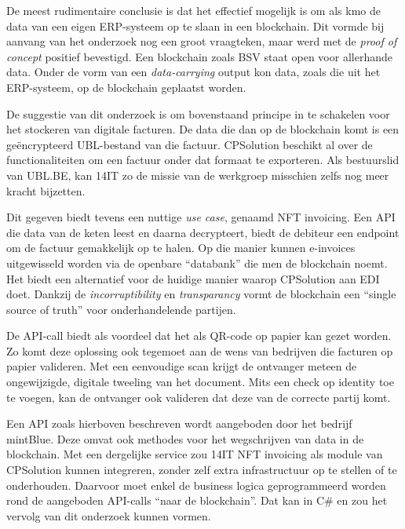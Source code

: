 De meest rudimentaire conclusie is dat het effectief mogelijk is om als kmo de data van een eigen ERP-systeem op te slaan in een blockchain. Dit vormde bij aanvang van het onderzoek nog een groot vraagteken, maar werd met de \textit{proof of concept} positief bevestigd. Een blockchain zoals BSV staat open voor allerhande data. Onder de vorm van een \textit{data-carrying} output kon data, zoals die uit het ERP-systeem, op de blockchain geplaatst worden. 

De suggestie van dit onderzoek is om bovenstaand principe in te schakelen voor het stockeren van digitale facturen. De data die dan op de blockchain komt is een geëncrypteerd UBL-bestand van die factuur. CPSolution beschikt al over de functionaliteiten om een factuur onder dat formaat te exporteren. Als bestuurslid van UBL.BE, kan 14IT zo de missie van de werkgroep misschien zelfs nog meer kracht bijzetten.

Dit gegeven biedt tevens een nuttige \textit{use case}, genaamd NFT invoicing. Een API die data van de keten leest en daarna decrypteert, biedt de debiteur een endpoint om de factuur gemakkelijk op te halen. Op die manier kunnen e-invoices uitgewisseld worden via de openbare ``databank'' die men de blockchain noemt. Het biedt een alternatief voor de huidige manier waarop CPSolution aan EDI doet. Dankzij de \textit{incorruptibility} en \textit{transparancy} vormt de blockchain een ``single source of truth'' voor onderhandelende partijen.

De API-call biedt als voordeel dat het als QR-code op papier kan gezet worden. Zo komt deze oplossing ook tegemoet aan de wens van bedrijven die facturen op papier valideren. Met een eenvoudige scan krijgt de ontvanger meteen de ongewijzigde, digitale tweeling van het document. Mits een check op identity toe te voegen, kan de ontvanger ook valideren dat deze van de correcte partij komt.

Een API zoals hierboven beschreven wordt aangeboden door het bedrijf mintBlue. Deze omvat ook methodes voor het wegschrijven van data in de blockchain. Met een dergelijke service zou 14IT NFT invoicing als module van CPSolution kunnen integreren, zonder zelf extra infrastructuur op te stellen of te onderhouden. Daarvoor moet enkel de business logica geprogrammeerd worden rond de aangeboden API-calls ``naar de blockchain''. Dat kan in C\# en zou het vervolg van dit onderzoek kunnen vormen.